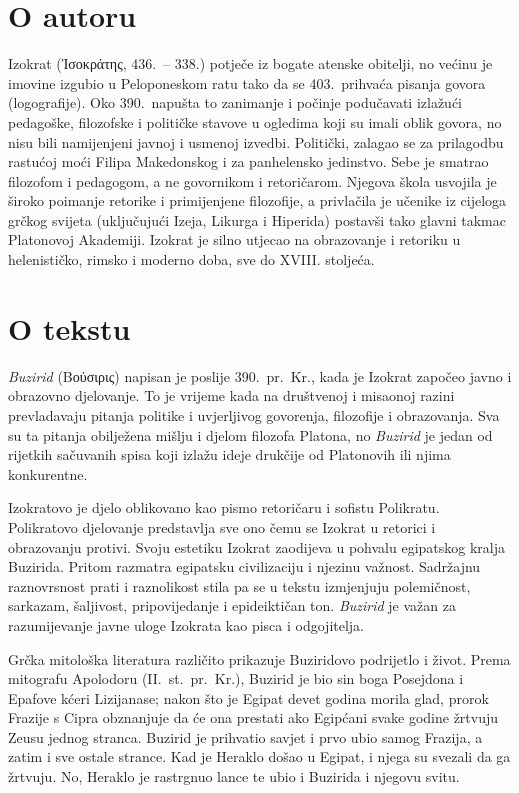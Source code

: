 \section*{O autoru}

Izokrat (Ἰσοκράτης, 436.\ – 338.) potječe iz bogate atenske obitelji, no većinu je imovine izgubio u Peloponeskom ratu tako da se 403.\ prihvaća pisanja govora (logografije). Oko 390.\ napušta to zanimanje i počinje podučavati izlažući pedagoške, filozofske i političke stavove u ogledima koji su imali oblik govora, no nisu bili namijenjeni javnoj i usmenoj izvedbi. Politički, zalagao se za prilagodbu rastućoj moći Filipa Makedonskog i za panhelensko jedinstvo. Sebe je smatrao filozofom i pedagogom, a ne govornikom i retoričarom. Njegova škola usvojila je široko poimanje retorike i primijenjene filozofije, a privlačila je učenike iz cijeloga grčkog svijeta (uključujući Izeja, Likurga i Hiperida) postavši tako glavni takmac Platonovoj Akademiji. Izokrat je silno utjecao na obrazovanje i retoriku u helenističko, rimsko i moderno doba, sve do XVIII. stoljeća.

\section*{O tekstu}

\textit{Buzirid} (Βούσιρις) napisan je poslije 390.\ pr.~Kr., kada je Izokrat započeo javno i obrazovno djelovanje. To je vrijeme kada na društvenoj i misaonoj razini prevladavaju pitanja politike i uvjerljivog govorenja, filozofije i obrazovanja. Sva su ta pitanja obilježena mišlju i djelom filozofa Platona, no \textit{Buzirid} je jedan od rijetkih sačuvanih spisa koji izlažu ideje drukčije od Platonovih ili njima konkurentne. 

Izokratovo je djelo oblikovano kao pismo retoričaru i sofistu Polikratu. Polikratovo djelovanje predstavlja sve ono čemu se Izokrat u retorici i obrazovanju protivi. Svoju estetiku Izokrat zaodijeva u pohvalu egipatskog kralja Buzirida. Pritom razmatra egipatsku civilizaciju i njezinu važnost. Sadržajnu raznovrsnost prati i raznolikost stila pa se u tekstu izmjenjuju polemičnost, sarkazam, šaljivost, pripovijedanje i epideiktičan ton. \textit{Buzirid} je važan za razumijevanje javne uloge Izokrata kao pisca i odgojitelja.

Grčka mitološka literatura različito prikazuje Buziridovo podrijetlo i život. Prema mitografu Apolodoru (II.~st.\ pr.~Kr.), Buzirid je bio sin boga Posejdona i Epafove kćeri Lizijanase; nakon što je Egipat devet godina morila glad, prorok Frazije s Cipra obznanjuje da će ona prestati ako Egipćani svake godine žrtvuju Zeusu jednog stranca. Buzirid je prihvatio savjet i prvo ubio samog Frazija, a zatim i sve ostale strance. Kad je Heraklo došao u Egipat, i njega su svezali da ga žrtvuju. No, Heraklo je rastrgnuo lance te ubio i Buzirida i njegovu svitu. 

